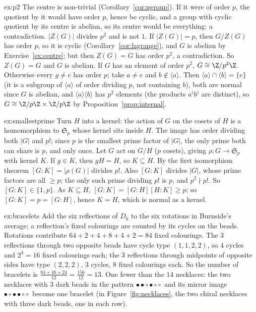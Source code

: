\begin{solution}{ex:p2}
\idea The centre is non-trivial (Corollary~\ref{cor:pgroup}). If it were of order $p$, the quotient by it would have order $p$, hence be cyclic, and a group with cyclic quotient by its centre is abelian, so its centre would be everything: a contradiction.
\writeup $|Z(G)|$ divides $p^2$ and is not $1$. If $|Z(G)|=p$, then $G/Z(G)$ has order $p$, so it is cyclic (Corollary~\ref{cor:lagrange}), and $G$ is abelian by Exercise~\ref{ex:centre}; but then $Z(G)=G$ has order $p^2$, a contradiction. So $Z(G)=G$ and $G$ is abelian. If $G$ has an element of order $p^2$, $G\cong\Z/p^2\Z$. Otherwise every $g\ne e$ has order $p$; take $a\ne e$ and $b\notin\langle a\rangle$. Then $\langle a\rangle\cap\langle b\rangle=\{e\}$ (it is a subgroup of $\langle a\rangle$ of order dividing $p$, not containing $b$), both are normal since $G$ is abelian, and $\langle a\rangle\langle b\rangle$ has $p^2$ elements (the products $a^ib^j$ are distinct), so $G\cong\Z/p\Z\times\Z/p\Z$ by Proposition~\ref{prop:internal}.
\end{solution}

\begin{solution}{ex:smallestprime}
\idea Turn $H$ into a kernel: the action of $G$ on the cosets of $H$ is a homomorphism to $\mathfrak S_p$ whose kernel sits inside $H$. The image has order dividing both $|G|$ and $p!$; since $p$ is the smallest prime factor of $|G|$, the only prime both can share is $p$, and only once.
\writeup Let $G$ act on $G/H$ ($p$ cosets), giving $\rho:G\to\mathfrak S_p$ with kernel $K$. If $g\in K$, then $gH=H$, so $K\subseteq H$. By the first isomorphism theorem $[G:K]=|\rho(G)|$ divides $p!$. Also $[G:K]$ divides $|G|$, whose prime factors are all $\ge p$; the only such prime dividing $p!$ is $p$, and $p^2\nmid p!$. So $[G:K]\in\{1,p\}$. As $K\subseteq H$, $[G:K]=[G:H][H:K]\ge p$; so $[G:K]=p=[G:H]$, hence $K=H$, which is normal as a kernel.
\end{solution}

\begin{solution}{ex:bracelets}
\idea Add the six reflections of $D_6$ to the six rotations in Burnside's average; a reflection's fixed colourings are counted by its cycles on the beads.
\writeup Rotations contribute $64+2+4+8+4+2=84$ fixed colourings. The $3$ reflections through two opposite beads have cycle type $(1,1,2,2)$, so $4$ cycles and $2^4=16$ fixed colourings each; the $3$ reflections through midpoints of opposite sides have type $(2,2,2)$, $3$ cycles, $8$ fixed colourings each. So the number of bracelets is $\frac{84+48+24}{12}=\frac{156}{12}=13$. One fewer than the $14$ necklaces: the two necklaces with $3$ dark beads in the pattern $\bullet\bullet\circ\bullet\circ\circ$ and its mirror image $\bullet\circ\bullet\bullet\circ\circ$ become one bracelet (in Figure~\ref{fig:necklaces}, the two chiral necklaces with three dark beads, one in each row).
\end{solution}

